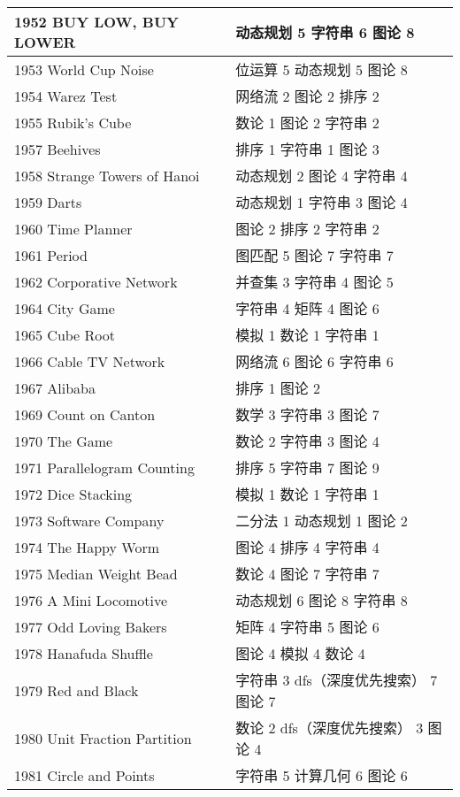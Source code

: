 \begin{longtable}{| p{} | p{} |}
 1952 BUY LOW, BUY LOWER  & 动态规划 5 字符串 6 图论 8 \\ \hline
 1953 World Cup Noise  & 位运算 5 动态规划 5 图论 8 \\ \hline
 1954 Warez Test  & 网络流 2 图论 2 排序 2 \\ \hline
 1955 Rubik's Cube  & 数论 1 图论 2 字符串 2 \\ \hline
 1957 Beehives  & 排序 1 字符串 1 图论 3 \\ \hline
 1958 Strange Towers of Hanoi  & 动态规划 2 图论 4 字符串 4 \\ \hline
 1959 Darts  & 动态规划 1 字符串 3 图论 4 \\ \hline
 1960 Time Planner  & 图论 2 排序 2 字符串 2 \\ \hline
 1961 Period  & 图匹配 5 图论 7 字符串 7 \\ \hline
 1962 Corporative Network  & 并查集 3 字符串 4 图论 5 \\ \hline
 1964 City Game  & 字符串 4 矩阵 4 图论 6 \\ \hline
 1965 Cube Root  & 模拟 1 数论 1 字符串 1 \\ \hline
 1966 Cable TV Network  & 网络流 6 图论 6 字符串 6 \\ \hline
 1967 Alibaba  & 排序 1 图论 2 \\ \hline
 1969 Count on Canton  & 数学 3 字符串 3 图论 7 \\ \hline
 1970 The Game  & 数论 2 字符串 3 图论 4 \\ \hline
 1971 Parallelogram Counting  & 排序 5 字符串 7 图论 9 \\ \hline
 1972 Dice Stacking  & 模拟 1 数论 1 字符串 1 \\ \hline
 1973 Software Company  & 二分法 1 动态规划 1 图论 2 \\ \hline
 1974 The Happy Worm  & 图论 4 排序 4 字符串 4 \\ \hline
 1975 Median Weight Bead  & 数论 4 图论 7 字符串 7 \\ \hline
 1976 A Mini Locomotive  & 动态规划 6 图论 8 字符串 8 \\ \hline
 1977 Odd Loving Bakers  & 矩阵 4 字符串 5 图论 6 \\ \hline
 1978 Hanafuda Shuffle  & 图论 4 模拟 4 数论 4 \\ \hline
 1979 Red and Black  & 字符串 3 dfs（深度优先搜索） 7 图论 7 \\ \hline
 1980 Unit Fraction Partition  & 数论 2 dfs（深度优先搜索） 3 图论 4 \\ \hline
 1981 Circle and Points  & 字符串 5 计算几何 6 图论 6 \\ \hline

\end{longtable}

